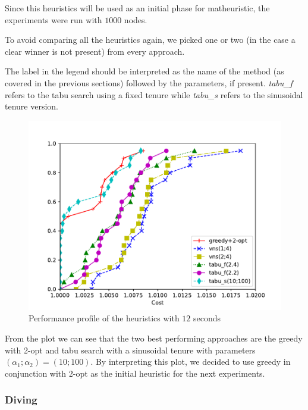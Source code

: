 \documentclass{article}
\begin{document}
Since this heuristics will be used as an initial phase for matheuristic,
the experiments were run with $1000$ nodes.

To avoid comparing all the heuristics again, we picked one or two (in the case
a clear winner is not present) from every approach.

The label in the legend should be interpreted as the name of the method (as
covered in the previous sections) followed by the parameters, if present.
\textit{tabu\_f} refers to the tabu search using a fixed tenure while
\textit{tabu\_s} refers to the sinusoidal tenure version.

\begin{figure}[ht]
        \caption{Performance profile of the heuristics with $12$ seconds}
        \label{fig:ht_best12}
        \centering
        \includegraphics[width=340pt]{assets/ht_best12.pdf}
\end{figure}

From the plot we can see that the two best performing approaches are the greedy
with 2-opt and tabu search with a sinusoidal tenure with parameters
$\left(\alpha_1; \alpha_2\right) = \left(10;100\right)$.
By interpreting this plot, we decided to use greedy in conjunction with 2-opt
as the initial heuristic for the next experiments.

\clearpage
\subsubsection{Diving}

\end{document}
